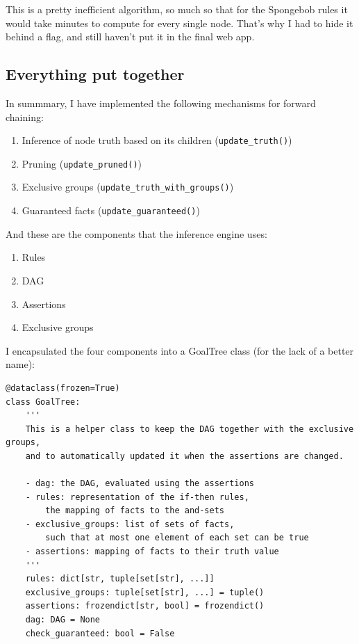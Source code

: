 \documentclass[11pt]{article}
\begin{document}
This is a pretty inefficient algorithm,
so much so that for the Spongebob rules it would take minutes to compute for every single node.
That's why I had to hide it behind a flag, and still haven't put it in the final web app.

\subsection{Everything put together}
\label{sec:org0109cba}

In summmary, I have implemented the following mechanisms for forward chaining:
\begin{enumerate}
\item Inference of node truth based on its children (\texttt{update\_truth()})
\item Pruning (\texttt{update\_pruned()})
\item Exclusive groups (\texttt{update\_truth\_with\_groups()})
\item Guaranteed facts (\texttt{update\_guaranteed()})
\end{enumerate}

And these are the components that the inference engine uses:
\begin{enumerate}
\item Rules
\item DAG
\item Assertions
\item Exclusive groups
\end{enumerate}

I encapsulated the four components into a GoalTree class (for the lack of a better name):
\begin{verbatim}
@dataclass(frozen=True)
class GoalTree:
    '''
    This is a helper class to keep the DAG together with the exclusive groups,
    and to automatically updated it when the assertions are changed.

    - dag: the DAG, evaluated using the assertions
    - rules: representation of the if-then rules,
        the mapping of facts to the and-sets
    - exclusive_groups: list of sets of facts,
        such that at most one element of each set can be true
    - assertions: mapping of facts to their truth value
    '''
    rules: dict[str, tuple[set[str], ...]]
    exclusive_groups: tuple[set[str], ...] = tuple()
    assertions: frozendict[str, bool] = frozendict()
    dag: DAG = None
    check_guaranteed: bool = False
\end{verbatim}
\end{document}
